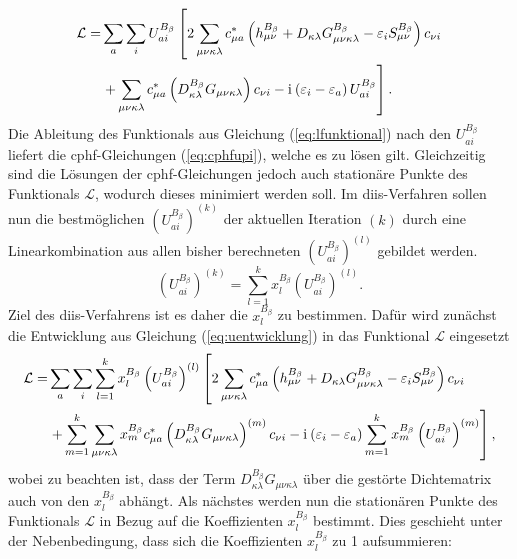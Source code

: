     \begin{equation}\label{eq:lfunktional}
    \begin{aligned}
    \mathcal{L}=&\sum_a\sum_i U_{ai}^{B_\beta}\left[2\sum_{\mu\nu\kappa\lambda}c_{\mu a}^*\left(h_{\mu\nu}^{B_\beta}+D_{\kappa\lambda}G_{\mu\nu\kappa\lambda}^{B_\beta}-\varepsilon_i S_{\mu\nu}^{B_\beta}\right)c_{\nu i}\right.\\
    &\left.+\sum_{\mu\nu\kappa\lambda}c_{\mu a}^*\left(D_{\kappa\lambda}^{B_\beta}G_{\mu\nu\kappa\lambda}\right)c_{\nu i}-\mathrm{i}\mkern1mu\left(\varepsilon_i-\varepsilon_a\right)U_{ai}^{B_\beta}\right].
    \end{aligned}
    \end{equation}
    Die Ableitung des Funktionals aus Gleichung (\ref{eq:lfunktional}) nach den $U_{ai}^{B_\beta}$ liefert die \ac{cphf}-Gleichungen (\ref{eq:cphfupi}), welche es zu lösen gilt. Gleichzeitig sind die Lösungen der \ac{cphf}-Gleichungen jedoch auch stationäre Punkte des Funktionals $\mathcal{L}$, wodurch dieses minimiert werden soll. Im \ac{diis}-Verfahren sollen nun die bestmöglichen $\left(U_{ai}^{B_\beta}\right)^{(k)}$ der aktuellen Iteration $(k)$ durch eine Linearkombination aus allen bisher berechneten $\left(U_{ai}^{B_\beta}\right)^{(l)}$ gebildet werden.
    \begin{equation}\label{eq:uentwicklung}
    \left(U_{ai}^{B_\beta}\right)^{(k)}=\sum_{l=1}^k x_l^{B_\beta}\left(U_{ai}^{B_\beta}\right)^{(l)}.
    \end{equation}
    Ziel des \ac{diis}-Verfahrens ist es daher die $x_l^{B_\beta}$ zu bestimmen. Dafür wird zunächst die Entwicklung aus Gleichung (\ref{eq:uentwicklung}) in das Funktional $\mathcal{L}$ eingesetzt
    \begin{equation}
    \begin{aligned}
    \mathcal{L}=&\sum_a\sum_i \sum_{l=1}^k x_l^{B_\beta}\left(U_{ai}^{B_\beta}\right)^{(l)}\left[2\sum_{\mu\nu\kappa\lambda}c_{\mu a}^*\left(h_{\mu\nu}^{B_\beta}+D_{\kappa\lambda}G_{\mu\nu\kappa\lambda}^{B_\beta}-\varepsilon_i S_{\mu\nu}^{B_\beta}\right)c_{\nu i}\right.\\
    &\left.+\sum_{m=1}^k\sum_{\mu\nu\kappa\lambda}x_m^{B_\beta} c_{\mu a}^*\left(D_{\kappa\lambda}^{B_\beta}G_{\mu\nu\kappa\lambda}\right)^{(m)}c_{\nu i}-\mathrm{i}\mkern1mu\left(\varepsilon_i-\varepsilon_a\right)\sum_{m=1}^k x_m^{B_\beta}\left(U_{ai}^{B_\beta}\right)^{(m)}\right],
    \end{aligned}
    \end{equation}  
    wobei zu beachten ist, dass der Term $D_{\kappa\lambda}^{B_\beta}G_{\mu\nu\kappa\lambda}$ über die gestörte Dichtematrix auch von den $x_l^{B_\beta}$ abhängt. Als nächstes werden nun die stationären Punkte des Funktionals $\mathcal{L}$ in Bezug auf die Koeffizienten $x_l^{B_\beta}$ bestimmt. Dies geschieht unter der Nebenbedingung, dass sich die Koeffizienten $x_l^{B_\beta}$ zu 1 aufsummieren:

